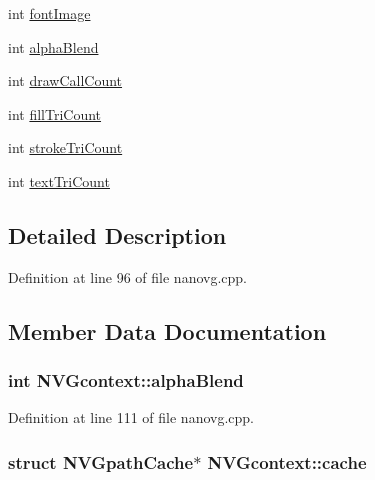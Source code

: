 \begin{DoxyCompactItemize}
\item 
int \hyperlink{struct_n_v_gcontext_a06c1243e6199595ca2d826ccac3e3431}{font\+Image}
\item 
int \hyperlink{struct_n_v_gcontext_a7ce148f8962205ce5ef67f7a0f6d6ac6}{alpha\+Blend}
\item 
int \hyperlink{struct_n_v_gcontext_a28cd8a8b1554599f13d4314e7ac4b80f}{draw\+Call\+Count}
\item 
int \hyperlink{struct_n_v_gcontext_a11846e12820c5acac46edb9f0b12d289}{fill\+Tri\+Count}
\item 
int \hyperlink{struct_n_v_gcontext_a543111c48849661847b5bf9707e7aac6}{stroke\+Tri\+Count}
\item 
int \hyperlink{struct_n_v_gcontext_ae02585c93bfdeab6edd75d4777480ed1}{text\+Tri\+Count}
\end{DoxyCompactItemize}


\subsection{Detailed Description}


Definition at line 96 of file nanovg.\+cpp.



\subsection{Member Data Documentation}
\hypertarget{struct_n_v_gcontext_a7ce148f8962205ce5ef67f7a0f6d6ac6}{
\subsubsection[{alpha\+Blend}]{\setlength{\rightskip}{0pt plus 5cm}int N\+V\+Gcontext\+::alpha\+Blend}}\label{struct_n_v_gcontext_a7ce148f8962205ce5ef67f7a0f6d6ac6}


Definition at line 111 of file nanovg.\+cpp.

\hypertarget{struct_n_v_gcontext_aaac08d9a828908e7ec66c7ebed1b5c08}{
\subsubsection[{cache}]{\setlength{\rightskip}{0pt plus 5cm}struct {\bf N\+V\+Gpath\+Cache}$\ast$ N\+V\+Gcontext\+::cache}}\label{struct_n_v_gcontext_aaac08d9a828908e7ec66c7ebed1b5c08}


